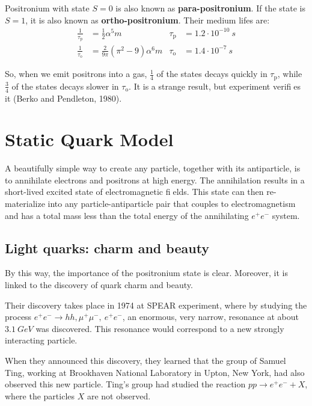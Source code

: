 \documentclass[../../main/main.tex]{subfiles}
\begin{document}
Positronium with state \( S = 0 \) is also known as \textbf{para-positronium}. If the state is \( S = 1 \), it is also known as \textbf{ortho-positronium}. Their medium lifes are:
\begin{align}
    \frac{1}{\tau_\mathrm{p}} &= \frac{1}{2} \alpha^5 m &   \tau_\mathrm{p} &= 1.2 \cdot 10^{-10} \ \si{s}  \\
    \frac{1}{\tau_\mathrm{o}} &= \frac{2}{9\pi} (\pi^2 - 9) \alpha^6 m &   \tau_\mathrm{o} &= 1.4 \cdot 10^{-7} \ \si{s}
\end{align}

So, when we emit positrons into a gas, \( \frac{1}{4} \) of the states decays quickly in \( \tau_\mathrm{p} \), while \( \frac{3}{4} \) of the states decays slower in \( \tau_\mathrm{o} \). It is a strange result, but experiment verifies it (Berko and Pendleton, 1980).





\section{Static Quark Model}
A beautifully simple way to create any particle, together with its antiparticle, is to annihilate electrons and positrons at high energy. The annihilation results in a short-lived excited state of electromagnetic fields. This state can then re-materialize into any particle-antiparticle pair that couples to electromagnetism and has a total mass less than the total energy of the annihilating  \( e^+ e^- \) system.



\subsection{Light quarks: charm and beauty}
By this way, the importance of the positronium state is clear. Moreover, it is linked to the discovery of quark charm and beauty.

Their discovery takes place in 1974 at SPEAR experiment, where by studying the process \( e^+ e^- \longrightarrow hh, \mu^+\mu^-, \ e^+e^- \), an enormous, very narrow, resonance at about \( \SI{3.1}{GeV} \) was discovered. This resonance would correspond to a new strongly interacting particle.

When they announced this discovery, they learned that the group of Samuel Ting, working at Brookhaven National Laboratory in Upton, New York, had also observed this new particle. Ting's group had studied the reaction \( pp \longrightarrow e^+e^- + X \), where the particles \( X \) are not observed.
\end{document}
